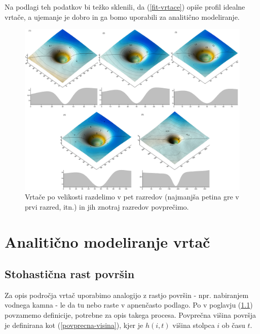 \documentclass[a4paper, twoside, 12pt]{book}
\begin{document}
  Na podlagi teh podatkov bi težko sklenili, da (\ref{fit-vrtace}) opiše profil idealne vrtače, a ujemanje je dobro in ga bomo uporabili za analitično modeliranje.

  \begin{figure}[h]
    \begin{center}
      \includegraphics[width=19cm,angle=90]{slike/vrtace-po-razredih-menisija}
    \end{center}
    \caption{Vrtače po velikosti razdelimo v pet razredov (najmanjša petina gre v prvi razred, itn.) in jih znotraj razredov povprečimo.}
    \label{fig:menisija-vrtace-po-razredih}
  \end{figure}


  \chapter{Analitično modeliranje vrtač}
  \label{analiticno-modeliranje}

  \section{Stohastična rast površin}
  \label{definicije}

  Za opis področja vrtač uporabimo analogijo z rastjo površin - npr. nabiranjem vodnega kamna - le da tu nebo raste v apnenčasto podlago.
  Po \cite{barabasi1995fractal} v poglavju (\ref{definicije}) povzamemo definicije, potrebne za opis takega procesa.
  Povprečna višina površja je definirana kot (\ref{povprecna-visina}), kjer je $h(i,t)$ višina stolpca $i$ ob času $t$.
\end{document}
